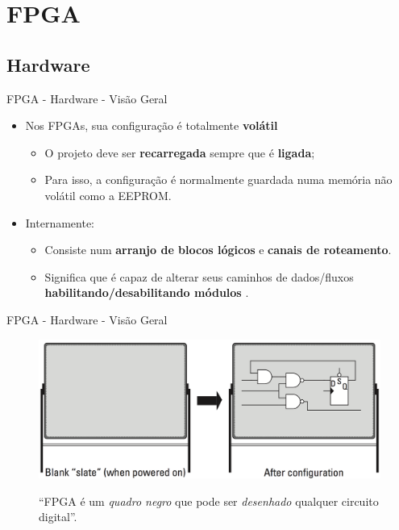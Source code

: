 

\section{FPGA}
	\subsection{Hardware}
	\begin{frame}{FPGA - Hardware - Visão Geral}
		\begin{itemize}
			\setlength\itemsep{1.5em}
			\item Nos FPGAs, sua configuração é totalmente \textbf{volátil}
			\begin{itemize}
				\setlength\itemsep{1em}
				\item O projeto deve ser \textbf{recarregada} sempre que é \textbf{ligada};
				\item Para isso, a configuração é normalmente guardada numa memória não volátil como a EEPROM.
			\end{itemize}

			\item Internamente:
			\begin{itemize}
				\setlength\itemsep{1em}
				\item Consiste num \textbf{arranjo de blocos lógicos} e \textbf{canais de roteamento}.

				\item Significa que é capaz de alterar seus caminhos de dados/fluxos \textbf{habilitando/desabilitando módulos} \cite{moreira2008}.
			\end{itemize}
		\end{itemize}
	\end{frame}


	\begin{frame}{FPGA - Hardware - Visão Geral}
		\begin{figure}[h]
			\centering
			\caption{``FPGA é um \textit{quadro negro} que pode ser \textit{desenhado} qualquer circuito digital''.}
			\includegraphics[height=0.7\textheight]{img/fpga/quadro.png}
			\label{fig:quadro}
		\end{figure}
	\end{frame}

